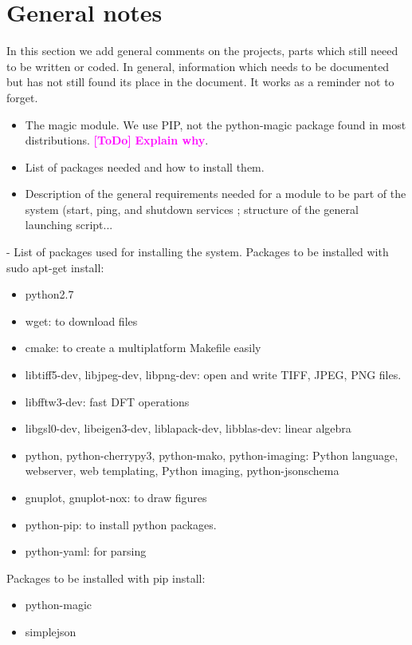 \documentclass[a4paper,12pt]{article}
\newcommand{\ToDo}[1]{\textcolor{magenta}{\textbf{[ToDo]} \textbf{#1}}}
\begin{document}
\section{General notes}
In this section we add general comments on the projects, parts which still neeed to be written or coded. In general, information which needs to be documented but has not still found its place in the document. It works as a reminder not to forget.

\begin{itemize}
  \item The magic module. We use PIP, not the python-magic package found in most distributions. \ToDo{Explain why}.
  \item List of packages needed and how to install them.
  \item Description of the general requirements needed for a module to be part of the system (start, ping, and shutdown services ; structure of the general launching script...
\end{itemize}

- List of packages used for installing the system. Packages to be installed with sudo apt-get install:

\begin{itemize}
\item python2.7
\item wget: to download files
\item cmake: to create a multiplatform Makefile easily
\item libtiff5-dev, libjpeg-dev, libpng-dev: open and write TIFF, JPEG, PNG files.
\item libfftw3-dev: fast DFT operations
\item libgsl0-dev, libeigen3-dev, liblapack-dev, libblas-dev: linear algebra
\item python, python-cherrypy3, python-mako, python-imaging: Python language, webserver, web templating, 
      Python imaging, python-jsonschema
\item gnuplot, gnuplot-nox: to draw figures
\item python-pip: to install python packages. 
\item python-yaml: for parsing
\end{itemize}
Packages to be installed with pip install:
\begin{itemize}
\item python-magic
\item simplejson
\end{itemize}
\end{document}
